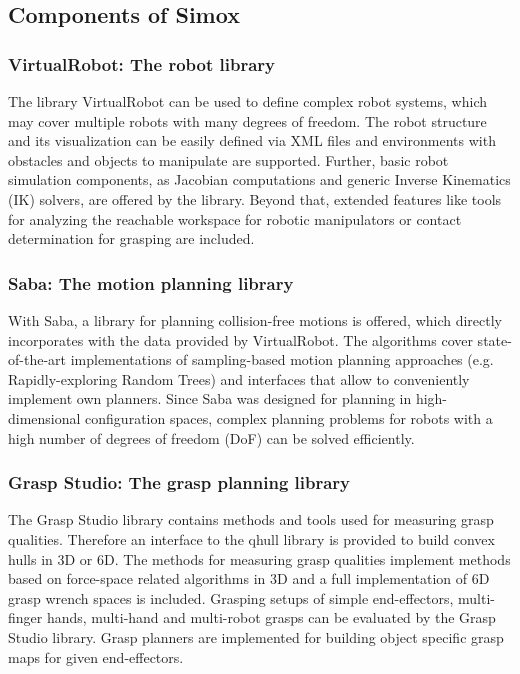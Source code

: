 \subsection{Components of Simox}
\subsubsection{VirtualRobot: The robot library}
The library VirtualRobot can be used to define complex robot systems, which may cover multiple robots with many degrees of freedom. The robot structure and its visualization can be easily defined via XML files and environments with obstacles and objects to manipulate are supported. Further, basic robot simulation components, as Jacobian computations and generic Inverse Kinematics (IK) solvers, are offered by the library. Beyond that, extended features like tools for analyzing the reachable workspace for robotic manipulators or contact determination for grasping are included. 
\subsubsection{Saba: The motion planning library}
With Saba, a library for planning collision-free motions is offered, which directly incorporates with the data provided by VirtualRobot. The algorithms cover state-of-the-art implementations of sampling-based motion planning approaches (e.g. Rapidly-exploring Random Trees) and interfaces that allow to conveniently implement own planners. Since Saba was designed for planning in high-dimensional configuration spaces, complex planning problems for robots with a high number of degrees of freedom (DoF) can be solved efficiently. 
\subsubsection{Grasp Studio: The grasp planning library}
The Grasp Studio library contains methods and tools used for measuring grasp qualities. Therefore an interface to the qhull library is provided to build convex hulls in 3D or 6D. The methods for measuring grasp qualities implement methods based on force-space related algorithms in 3D and a full implementation of 6D grasp wrench spaces is included. Grasping setups of simple end-effectors, multi-finger hands, multi-hand and multi-robot grasps can be evaluated by the Grasp Studio library. Grasp planners are implemented for building object specific grasp maps for given end-effectors. 
